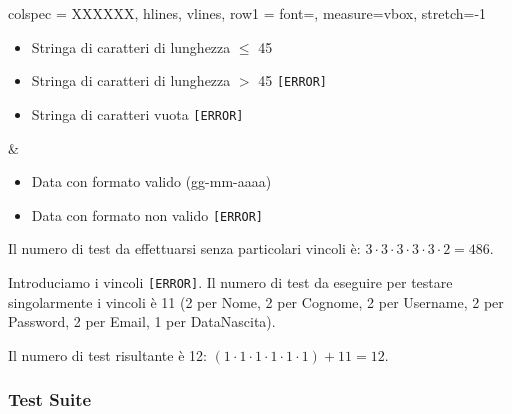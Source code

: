 \begin{table}[!hbp]
\begin{tblr}{
		colspec = XXXXXX,
		hlines, vlines,
		row{1} = {font=\bfseries},
		measure=vbox, stretch=-1
		}
\begin{itemize}[leftmargin=*]
			\item Stringa di caratteri di lunghezza $\leq$ 45
			\item Stringa di caratteri di lunghezza $>$ 45 \texttt{[ERROR]}
			\item Stringa di caratteri vuota \texttt{[ERROR]}
		\end{itemize} &
		\begin{itemize}[leftmargin=*]
			\item Data con formato valido (gg-mm-aaaa)
			\item Data con formato non valido \texttt{[ERROR]}
		\end{itemize}
	\end{tblr}
\end{table}

\noindent Il numero di test da effettuarsi senza particolari vincoli è: $3 \cdot 3 \cdot 3 \cdot 3 \cdot 3 \cdot 2 = 486$.

\noindent Introduciamo i vincoli \texttt{[ERROR]}. Il numero di test da eseguire per testare singolarmente i vincoli è 11 (2 per Nome, 2 per Cognome, 2 per Username, 2 per Password, 2 per Email, 1 per DataNascita).

\noindent Il numero di test risultante è 12: $(1 \cdot 1 \cdot 1 \cdot 1 \cdot 1 \cdot 1) + 11 = 12$.

\subsubsection*{Test Suite}

